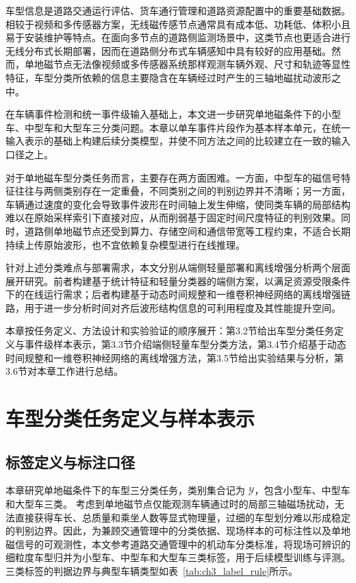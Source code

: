 \documentclass{xdupgthesis}
\begin{document}
车型信息是道路交通运行评估、货车通行管理和道路资源配置中的重要基础数据。相较于视频和多传感器方案，无线磁传感节点通常具有成本低、功耗低、体积小且易于安装维护等特点\cite{ch2_sifuentes2011wakeup}。在面向多节点的道路侧监测场景中，这类节点也更适合进行无线分布式长期部署\cite{R09}，因而在道路侧分布式车辆感知中具有较好的应用基础。然而，单地磁节点无法像视频或多传感器系统那样观测车辆外观、尺寸和轨迹等显性特征，车型分类所依赖的信息主要隐含在车辆经过时产生的三轴地磁扰动波形之中。

在车辆事件检测和统一事件级输入基础上，本文进一步研究单地磁条件下的小型车、中型车和大型车三分类问题。本章以单车事件片段作为基本样本单元，在统一输入表示的基础上构建后续分类模型，并使不同方法之间的比较建立在一致的输入口径之上。

对于单地磁车型分类任务而言，主要存在两方面困难。一方面，中型车的磁信号特征往往与两侧类别存在一定重叠，不同类别之间的判别边界并不清晰；另一方面，车辆通过速度的变化会导致事件波形在时间轴上发生伸缩，使同类车辆的局部结构难以在原始采样索引下直接对应，从而削弱基于固定时间尺度特征的判别效果。同时，道路侧单地磁节点还受到算力、存储空间和通信带宽等工程约束，不适合长期持续上传原始波形，也不宜依赖复杂模型进行在线推理。

针对上述分类难点与部署需求，本文分别从端侧轻量部署和离线增强分析两个层面展开研究。前者构建基于统计特征和轻量分类器的端侧方案，以满足资源受限条件下的在线运行需求；后者构建基于动态时间规整和一维卷积神经网络的离线增强链路，用于进一步分析时间对齐后波形结构信息的可利用程度及其性能提升空间。

本章按任务定义、方法设计和实验验证的顺序展开：第3.2节给出车型分类任务定义与事件级样本表示，第3.3节介绍端侧轻量车型分类方法，第3.4节介绍基于动态时间规整和一维卷积神经网络的离线增强方法，第3.5节给出实验结果与分析，第3.6节对本章工作进行总结。

\section{车型分类任务定义与样本表示}
\label{sec:ch3_task_data}

\subsection{标签定义与标注口径}
\label{subsec:ch3_data_build}

本章研究单地磁条件下的车型三分类任务，类别集合记为 $\mathcal{Y}$，包含小型车、中型车和大型车三类。
考虑到单地磁节点仅能观测车辆通过时的局部三轴磁场扰动，无法直接获得车长、总质量和乘坐人数等显式物理量，过细的车型划分难以形成稳定的判别边界。因此，为兼顾交通管理中的分类依据、现场样本的可标注性以及单地磁信号的可观测性，本文参考道路交通管理中的机动车分类标准\cite{ch3_mps_ga8022019}，将现场可辨识的细粒度车型归并为小型车、中型车和大型车三类标签，用于后续模型训练与评测。三类标签的判据边界与典型车辆类型如表~\ref{tab:ch3_label_rule}所示。
\end{document}

